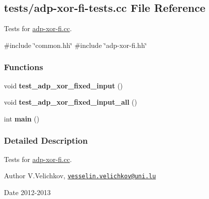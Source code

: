 \hypertarget{adp-xor-fi-tests_8cc}{\subsection{tests/adp-\/xor-\/fi-\/tests.cc \-File \-Reference}
\label{adp-xor-fi-tests_8cc}
}


\-Tests for \hyperlink{adp-xor-fi_8cc}{adp-\/xor-\/fi.\-cc}.  


{\ttfamily \#include \char`\"{}common.\-hh\char`\"{}}\*
{\ttfamily \#include \char`\"{}adp-\/xor-\/fi.\-hh\char`\"{}}\*
\subsubsection*{\-Functions}
\begin{DoxyCompactItemize}
\item 
\hypertarget{adp-xor-fi-tests_8cc_ab07f3e35c7d3357ad45b4e159f2f9197}{void {\bfseries test\-\_\-adp\-\_\-xor\-\_\-fixed\-\_\-input} ()}\label{adp-xor-fi-tests_8cc_ab07f3e35c7d3357ad45b4e159f2f9197}

\item 
\hypertarget{adp-xor-fi-tests_8cc_a84e69dae6b061627ffaa10547c0601d3}{void {\bfseries test\-\_\-adp\-\_\-xor\-\_\-fixed\-\_\-input\-\_\-all} ()}\label{adp-xor-fi-tests_8cc_a84e69dae6b061627ffaa10547c0601d3}

\item 
\hypertarget{adp-xor-fi-tests_8cc_ae66f6b31b5ad750f1fe042a706a4e3d4}{int {\bfseries main} ()}\label{adp-xor-fi-tests_8cc_ae66f6b31b5ad750f1fe042a706a4e3d4}

\end{DoxyCompactItemize}


\subsubsection{\-Detailed \-Description}
\-Tests for \hyperlink{adp-xor-fi_8cc}{adp-\/xor-\/fi.\-cc}. \begin{DoxyAuthor}{\-Author}
\-V.\-Velichkov, \href{mailto:vesselin.velichkov@uni.lu}{\tt vesselin.\-velichkov@uni.\-lu} 
\end{DoxyAuthor}
\begin{DoxyDate}{\-Date}
2012-\/2013 
\end{DoxyDate}
